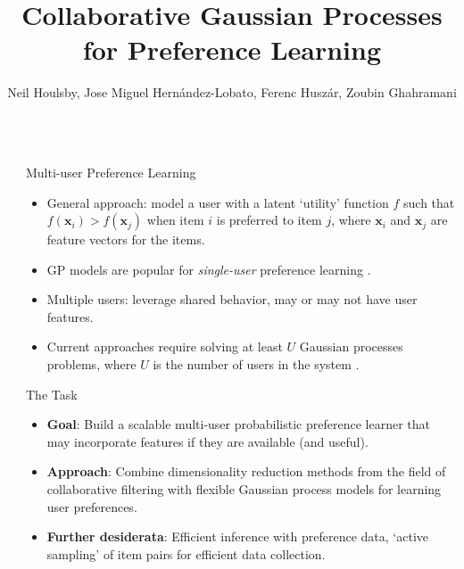 \documentclass[final]{beamer}
\title{Collaborative Gaussian Processes for Preference Learning}
\author{Neil Houlsby, Jose Miguel Hern\'{a}ndez-Lobato, Ferenc Husz\'{a}r, Zoubin Ghahramani}
\institute{Computational and Biological Learning Lab, Department of Engineering, University of Cambridge}
\newlength{\sepwid}
\newlength{\onecolwid}
\newcommand{\x}{\mathbf{x}}
\begin{document}
\begin{frame}[t]
  \begin{columns}[t]

  \begin{column}{\sepwid}\end{column}         %

  \begin{column}{\onecolwid}

    \begin{block}{Multi-user Preference Learning}
        \begin{itemize}
          \item General approach: model a user with a latent `utility' function $f$ such that $f(\x_i)>f(\x_j)$ when item $i$
            is preferred to item $j$, where $\x_i$ and $\x_j$ are feature vectors for the items.
          \item GP models are popular for \emph{single-user} preference learning
            \cite{chu2005}.
          \item Multiple users: leverage shared behavior, may or may not have user features.
          \item Current approaches require solving at least $U$  Gaussian processes problems,
		where $U$ is the number of users in the system \cite{bonilla2010, birlutiu2009}.
        \end{itemize}
      \end{block}

    \begin{alertblock}{The Task}
      \begin{itemize}
        \item {\bf Goal}: Build a scalable multi-user probabilistic preference learner that
            may incorporate features if they are available (and useful).
        \item {\bf Approach}: Combine dimensionality reduction methods from the field of collaborative filtering
          with flexible Gaussian process models for learning user preferences.
        \item {\bf Further desiderata}: Efficient inference with preference data, `active sampling' of item pairs for efficient data collection.
      \end{itemize}
    \end{alertblock}
  

\end{column}
\end{columns}
\end{frame}
\end{document}
